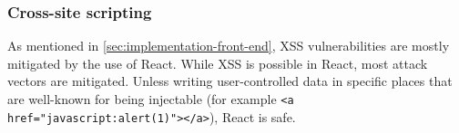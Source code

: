 \subsubsection{Cross-site scripting}
As mentioned in \cref{sec:implementation-front-end}, XSS vulnerabilities are
mostly mitigated by the use of React. While XSS is possible in React, most
attack vectors are mitigated. Unless writing user-controlled data in specific
places that are well-known for being injectable (for example
\texttt{<a href="javascript:alert(1)"></a>}), React is safe.


